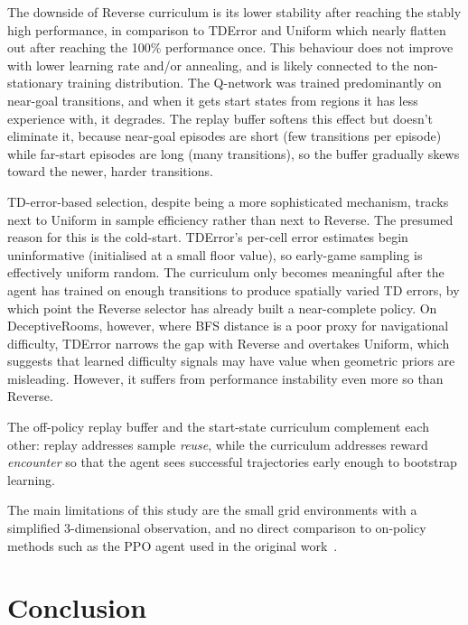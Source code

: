\documentclass{article}
\begin{document}
The downside of Reverse curriculum is its lower stability after reaching the stably high performance, in comparison to TDError and Uniform which nearly flatten out after reaching the 100\% performance once. This behaviour does not improve with lower learning rate and/or annealing, and is likely connected to the non-stationary training distribution. The Q-network was trained predominantly on near-goal transitions, and when it gets start states from regions it has less experience with, it degrades. The replay buffer softens this effect but doesn't eliminate it, because near-goal episodes are short (few transitions per episode) while far-start episodes are long (many transitions), so the buffer gradually skews toward the newer, harder transitions.

TD-error-based selection, despite being a more sophisticated mechanism,
tracks next to Uniform in sample efficiency rather than next to
Reverse. The presumed reason for this is the cold-start. TDError's per-cell error estimates begin uninformative (initialised at a small floor value), so early-game sampling is effectively uniform random. The curriculum only becomes meaningful after the agent has trained on enough transitions to produce spatially varied TD errors, by which point the Reverse selector has already built a near-complete policy. On DeceptiveRooms, however, where BFS distance is a poor proxy for navigational difficulty, TDError narrows the gap with Reverse and overtakes Uniform, which suggests that learned difficulty signals may have value when geometric priors are misleading. However, it suffers from performance instability even more so than Reverse.

The off-policy replay buffer and the start-state curriculum complement each other: replay addresses sample \emph{reuse}, while the curriculum addresses reward \emph{encounter} so that the agent sees successful
trajectories early enough to bootstrap learning.

The main limitations of this study are the small grid environments with a simplified 3-dimensional observation, and no direct comparison to on-policy methods such as the PPO agent used in the original work~\cite{florensa2017reverse}.

\section{Conclusion}
\label{sec:conclusion}
\end{document}
